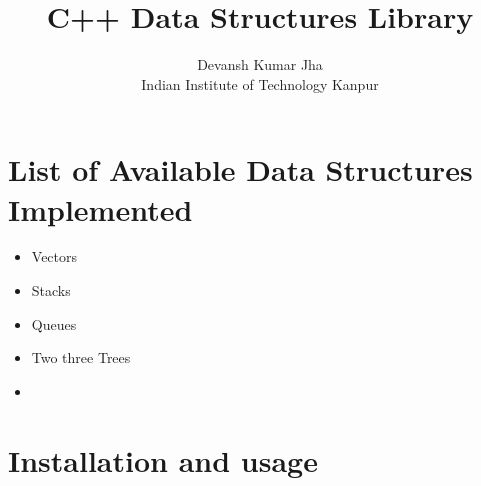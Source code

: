 \documentclass[a4paper,11pt]{article}
\title{C++ Data Structures Library}
\author{Devansh Kumar Jha\\ \large{Indian Institute of Technology Kanpur}}
\begin{document}
\maketitle

\section{List of Available Data Structures Implemented}
\begin{itemize}
\item Vectors
\item Stacks
\item Queues
\item Two three Trees
\item 
\end{itemize}

\section{Installation and usage}
\end{document}
